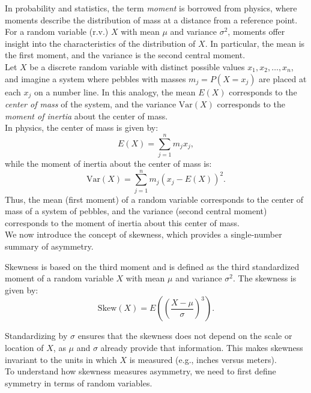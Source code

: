 In probability and statistics, the term \textit{moment} is borrowed from physics, where moments describe the distribution of mass at a distance from a reference point. For a random variable (r.v.) \( X \) with mean \( \mu \) and variance \( \sigma^2 \), moments offer insight into the characteristics of the distribution of \( X \). In particular, the mean is the first moment, and the variance is the second central moment.\\

Let \( X \) be a discrete random variable with distinct possible values \( x_1, x_2, \dots, x_n \), and imagine a system where pebbles with masses \( m_j = P(X = x_j) \) are placed at each \( x_j \) on a number line. In this analogy, the mean \( E(X) \) corresponds to the \textit{center of mass} of the system, and the variance \( \text{Var}(X) \) corresponds to the \textit{moment of inertia} about the center of mass.\\

In physics, the center of mass is given by:
\[
E(X) = \sum_{j=1}^{n} m_j x_j,
\]
while the moment of inertia about the center of mass is:
\[
\text{Var}(X) = \sum_{j=1}^{n} m_j (x_j - E(X))^2.
\]
Thus, the mean (first moment) of a random variable corresponds to the center of mass of a system of pebbles, and the variance (second central moment) corresponds to the moment of inertia about this center of mass.\\

We now introduce the concept of skewness, which provides a single-number summary of asymmetry. 

\begin{definition}
    Skewness is based on the third moment and is defined as the third standardized moment of a random variable \( X \) with mean \( \mu \) and variance \( \sigma^2 \). The skewness is given by:
    \[
    \text{Skew}(X) = E\left( \left( \frac{X - \mu}{\sigma} \right)^3 \right).
    \]    
\end{definition}

Standardizing by \( \sigma \) ensures that the skewness does not depend on the scale or location of \( X \), as \( \mu \) and \( \sigma \) already provide that information. This makes skewness invariant to the units in which \( X \) is measured (e.g., inches versus meters).\\

To understand how skewness measures asymmetry, we need to first define symmetry in terms of random variables.\\

